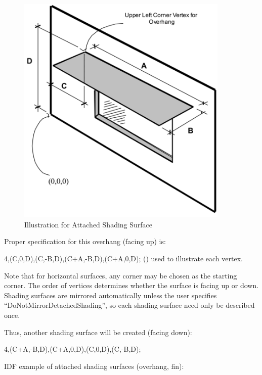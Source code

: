 \begin{figure}[hbtp] %
\centering
\includegraphics[width=0.9\textwidth, height=0.9\textheight, keepaspectratio=true]{media/image059.png}
\caption{Illustration for Attached Shading Surface \protect \label{fig:illustration-for-attached-shading-surface}}
\end{figure}

Proper specification for this overhang (facing up) is:

4,(C,0,D),(C,-B,D),(C+A,-B,D),(C+A,0,D); () used to illustrate each vertex.

\begin{callout}
Note that for horizontal surfaces, any corner may be chosen as the starting corner. The order of vertices determines whether the surface is facing up or down. Shading surfaces are mirrored automatically unless the user specifies ``DoNotMirrorDetachedShading'', so each shading surface need only be described once.
\end{callout}

Thus, another shading surface will be created (facing down):

4,(C+A,-B,D),(C+A,0,D),(C,0,D),(C,-B,D);

IDF example of attached shading surfaces (overhang, fin):

